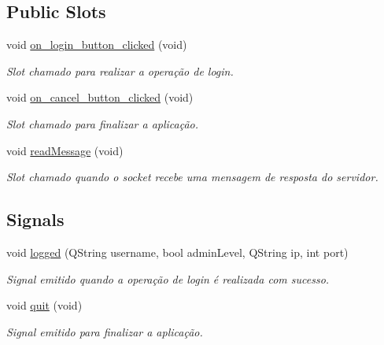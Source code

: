 \subsection*{Public Slots}
\begin{DoxyCompactItemize}
\item 
void \hyperlink{classMyLoginDialog_ab850edc55bc360a5271f8da572d9b84b}{on\+\_\+login\+\_\+button\+\_\+clicked} (void)
\begin{DoxyCompactList}\small\item\em Slot chamado para realizar a operação de login. \end{DoxyCompactList}\item 
void \hyperlink{classMyLoginDialog_a98b534e1f3e50217b7d0d603846f6fa3}{on\+\_\+cancel\+\_\+button\+\_\+clicked} (void)
\begin{DoxyCompactList}\small\item\em Slot chamado para finalizar a aplicação. \end{DoxyCompactList}\item 
void \hyperlink{classMyLoginDialog_a8ab28097bd87a10588d53b99ffcfb3dd}{read\+Message} (void)
\begin{DoxyCompactList}\small\item\em Slot chamado quando o socket recebe uma mensagem de resposta do servidor. \end{DoxyCompactList}\end{DoxyCompactItemize}
\subsection*{Signals}
\begin{DoxyCompactItemize}
\item 
void \hyperlink{classMyLoginDialog_acd80142b97ff032e73847b4ad54ea272}{logged} (Q\+String username, bool admin\+Level, Q\+String ip, int port)
\begin{DoxyCompactList}\small\item\em Signal emitido quando a operação de login é realizada com sucesso. \end{DoxyCompactList}\item 
void \hyperlink{classMyLoginDialog_a81b2fde13842c6557400e0e35b9dd1e0}{quit} (void)\hypertarget{classMyLoginDialog_a81b2fde13842c6557400e0e35b9dd1e0}{}\label{classMyLoginDialog_a81b2fde13842c6557400e0e35b9dd1e0}

\begin{DoxyCompactList}\small\item\em Signal emitido para finalizar a aplicação. \end{DoxyCompactList}\end{DoxyCompactItemize}
